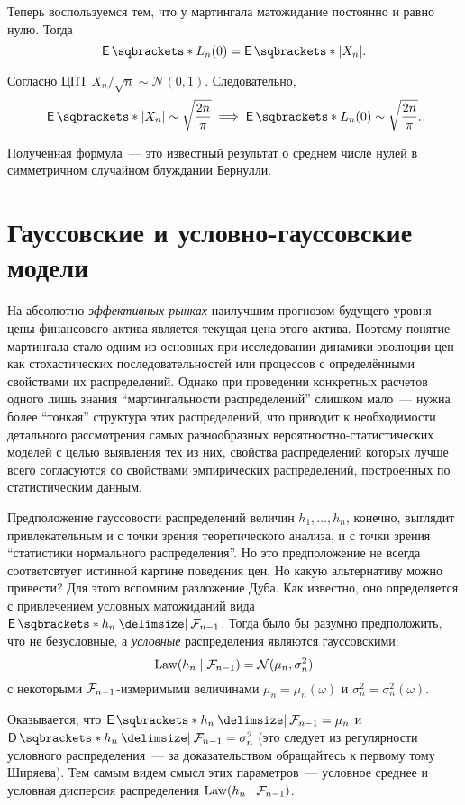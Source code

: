 \begin{example}
	Теперь воспользуемся тем, что у мартингала матожидание постоянно и равно 
	нулю. Тогда
	\[
		\E{L_{n}(0)} = \E{|X_{n}|}.
	\]
	
	Согласно ЦПТ \(X_{n}/\sqrt{n} \sim \mathcal{N}(0, 1)\). Следовательно,
	\[
		\E{|X_{n}|} \sim \sqrt{\frac{2n}{\pi}} \implies \E{L_{n}(0)} \sim 
		\sqrt{\frac{2n}{\pi}}.
	\]
	
	Полученная формула~--- это известный результат о среднем числе нулей в 
	симметричном случайном блуждании Бернулли.
\end{example}
\section{Гауссовские и условно-гауссовские модели}
На абсолютно \emph{эффективных рынках} наилучшим прогнозом будущего уровня цены 
финансового актива является текущая цена этого актива. Поэтому понятие 
мартингала стало одним из основных при исследовании динамики эволюции цен как 
стохастических последовательностей или процессов с определёнными свойствами их 
распределений. Однако при проведении конкретных расчетов одного лишь знания 
``мартингальности распределений'' слишком мало~--- нужна более ``тонкая'' 
структура этих распределений, что приводит к необходимости детального 
рассмотрения самых разнообразных вероятностно-статистических моделей с целью 
выявления тех из них, свойства распределений которых лучше всего согласуются со 
свойствами эмпирических распределений, построенных по статистическим данным.

Предположение гауссовости распределений величин \(h_{1}, \ldots, h_{n}\), 
конечно, выглядит привлекательным и с точки зрения теоретического анализа, и с 
точки зрения ``статистики нормального распределения''. Но это предположение не 
всегда соответсвтует истинной картине поведения цен. Но какую альтернативу 
можно привести? Для этого вспомним разложение Дуба. Как известно, оно 
определяется с привлечением условных матожиданий вида \(\E{h_{n} \given \F_{n - 
1}}\). Тогда было бы разумно предположить, что не безусловные, а 
\emph{условные} распределения являются гауссовскими:
\[
	\operatorname{Law}(h_{n} \mid \mathcal{F}_{n - 1}) = \mathcal{N}(\mu_{n}, \sigma_{n}^{2})
\]
с некоторыми \(\mathcal{F}_{n - 1}\)-измеримыми величинами \(\mu_{n} = \mu_{n}(\omega)\) 
и \(\sigma_{n}^{2} = \sigma_{n}^{2}(\omega)\).

Оказывается, что \(\E{h_{n} \given \F_{n - 1}} = \mu_{n}\) и \(\D{h_{n} \given 
\F_{n - 1}} = \sigma_{n}^{2}\) (это следует из регулярности условного 
распределения~--- за доказательством обращайтесь к первому тому Ширяева). Тем 
самым видем смысл этих параметров~--- условное среднее и условная дисперсия 
распределения \(\operatorname{Law}(h_{n} \mid \mathcal{F}_{n - 1})\).

